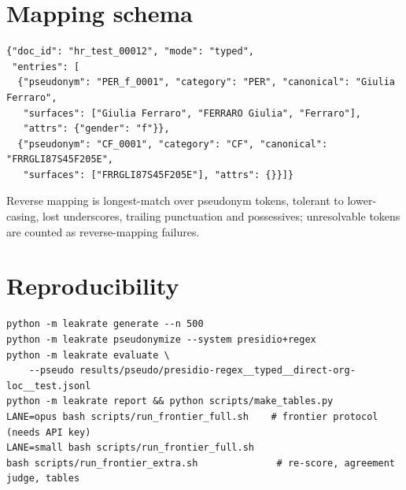 \documentclass[11pt,a4paper]{article}
\begin{document}
\section{Mapping schema}
\begin{verbatim}
{"doc_id": "hr_test_00012", "mode": "typed",
 "entries": [
  {"pseudonym": "PER_f_0001", "category": "PER", "canonical": "Giulia Ferraro",
   "surfaces": ["Giulia Ferraro", "FERRARO Giulia", "Ferraro"],
   "attrs": {"gender": "f"}},
  {"pseudonym": "CF_0001", "category": "CF", "canonical": "FRRGLI87S45F205E",
   "surfaces": ["FRRGLI87S45F205E"], "attrs": {}}]}
\end{verbatim}
Reverse mapping is longest-match over pseudonym tokens, tolerant to lower-casing, lost underscores, trailing punctuation and possessives; unresolvable tokens are counted as reverse-mapping failures.

\section{Reproducibility}
{\small
\begin{verbatim}
python -m leakrate generate --n 500
python -m leakrate pseudonymize --system presidio+regex
python -m leakrate evaluate \
    --pseudo results/pseudo/presidio-regex__typed__direct-org-loc__test.jsonl
python -m leakrate report && python scripts/make_tables.py
LANE=opus bash scripts/run_frontier_full.sh    # frontier protocol (needs API key)
LANE=small bash scripts/run_frontier_full.sh
bash scripts/run_frontier_extra.sh              # re-score, agreement judge, tables
\end{verbatim}}
\end{document}
